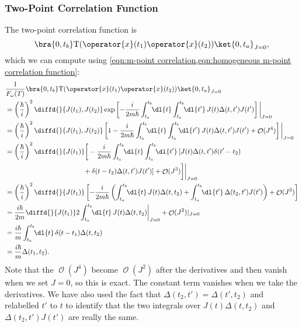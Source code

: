 \documentclass[fleqn]{NotesClass}
\newcommand*{\order}{\mathop{\mathcal{O}}}
\newcommand*{\timeorder}{\mathrm{T}}
\begin{document}
    \subsubsection{Two-Point Correlation Function}
    The two-point correlation function is
    \begin{equation}
        \bra{0, t_b} \timeorder(\operator{x}(t_1)\operator{x}(t_2))\ket{0, t_a}_{J=0},
    \end{equation}
    which we can compute using \cref{eqn:m-point correlation,eqn:homogeneous m-point correlation function}:
    \begingroup
    \allowdisplaybreaks
    \begin{align}
        &\frac{1}{F_{\omega}(T)}\bra{0, t_b} \timeorder(\operator{x}(t_1)\operator{x}(t_2))\ket{0, t_a}_{J=0}\\
        &= \left( \frac{\hbar}{i} \right)^2 \diffd{}{J(t_1), J(t_2)} \exp\left[ -\frac{i}{2m\hbar} \int_{t_a}^{t_b} \!\! \dl{t} \int_{t_a}^{t_b} \!\! \dl{t'} \, J(t)\Delta(t, t')J(t') \right] \bigg\vert_{J=0}\\
        &= \left( \frac{\hbar}{i} \right)^{2} \diffd{}{J(t_1), J(t_2)} \left[ 1 - \frac{i}{2m\hbar}\int_{t_a}^{t_b} \!\! \dl{t} \int_{t_a}^{t_b} \!\! \dl{t'} \, J(t)\Delta(t, t')J(t') + \order(J^4) \right] \bigg\vert_{J = 0}\notag\\
        &= \left( \frac{\hbar}{i} \right)^2 \diffd{}{J(t_1)} \bigg[ -\frac{i}{2m\hbar}\int_{t_a}^{t_b} \!\! \dl{t} \int_{t_a}^{t_b} \!\! \dl{t'} \, [J(t)\Delta(t, t')\delta(t' - t_2)\\
        &\hspace{4cm}+ \delta(t - t_2)\Delta(t, t')J(t')] + \order(J^3) \bigg] \bigg\vert_{J = 0}\\
        &= \left( \frac{\hbar}{i} \right)^2 \diffd{}{J(t_1)}\left[ -\frac{i}{2m\hbar}\left( \int_{t_a}^{t_b}\!\!\dl{t} \, J(t)\Delta(t, t_2) + \int_{t_a}^{t_b} \!\! \dl{t'} \, \Delta(t_2, t')J(t')\right) + \order(J^3) \right]\notag\\
        &= \frac{i\hbar}{2m} \diffd{}{J(t_1)} 2\int_{t_a}^{t_b} \!\! \dl{t} \, J(t)\Delta(t, t_2) \bigg\vert_{J = 0} + \order(J^2)|_{J = 0}\\
        &= \frac{i\hbar}{m} \int_{t_a}^{t_b} \!\! \dl{t} \, \delta(t - t_1)\Delta(t, t_2)\\
        &= \frac{i\hbar}{m} \Delta(t_1, t_2).
    \end{align}
    \endgroup
    Note that the \(\order(J^4)\) become \(\order(J^2)\) after the derivatives and then vanish when we set \(J = 0\), so this is exact.
    The constant term vanishes when we take the derivatives.
    We have also used the fact that \(\Delta(t_2, t') = \Delta(t', t_2)\) and relabelled \(t'\) to \(t\) to identify that the two integrals over \(J(t)\Delta(t, t_2)\) and \(\Delta(t_2, t')J(t')\) are really the same.
    
\end{document}
